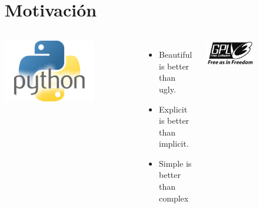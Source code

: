 

\section{Motivación}

{

	\begin{frame}{}
        \fontsize{11}{11}\selectfont
        \begin{columns}
            \vspace*{-5mm}
            \begin{center}
                \includegraphics[width=0.7\textwidth]{./Images/python.jpg}
            \end{center}
            \begin{itemize}
                \item Beautiful is better than ugly.
                \item Explicit is better than implicit.
                \item Simple is better than complex
            \end{itemize}
            \vspace*{-1.3cm}
            \begin{center}
            \includegraphics[width=0.5\textwidth]{./Images/gpl3.jpg}
            \end{center}


\end{columns}
\end{frame}}
